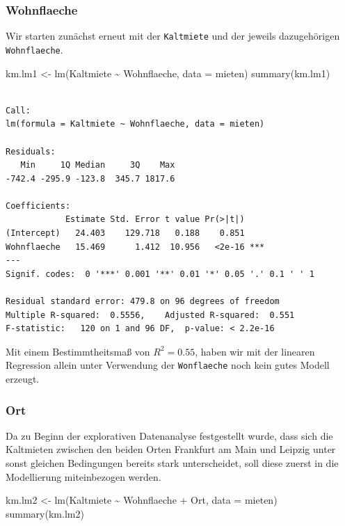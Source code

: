 \documentclass[
  a4paper,
  DIV=11]{scrartcl}
\newenvironment{Shaded}{\begin{snugshade}}{\end{snugshade}}
\newcommand{\AttributeTok}[1]{\textcolor[rgb]{0.40,0.45,0.13}{#1}}
\newcommand{\FunctionTok}[1]{\textcolor[rgb]{0.28,0.35,0.67}{#1}}
\newcommand{\NormalTok}[1]{\textcolor[rgb]{0.00,0.23,0.31}{#1}}
\newcommand{\OtherTok}[1]{\textcolor[rgb]{0.00,0.23,0.31}{#1}}
\newcommand{\SpecialCharTok}[1]{\textcolor[rgb]{0.37,0.37,0.37}{#1}}
\begin{document}
\hypertarget{wohnflaeche}{%
\subsubsection{Wohnflaeche}\label{wohnflaeche}}

Wir starten zunächst erneut mit der \texttt{Kaltmiete} und der jeweils
dazugehörigen \texttt{Wohnflaeche}.

\begin{Shaded}
\begin{Highlighting}[]
\NormalTok{km.lm1 }\OtherTok{\textless{}{-}} \FunctionTok{lm}\NormalTok{(Kaltmiete }\SpecialCharTok{\textasciitilde{}}\NormalTok{ Wohnflaeche, }\AttributeTok{data =}\NormalTok{ mieten)}
\FunctionTok{summary}\NormalTok{(km.lm1)}
\end{Highlighting}
\end{Shaded}

\begin{verbatim}

Call:
lm(formula = Kaltmiete ~ Wohnflaeche, data = mieten)

Residuals:
   Min     1Q Median     3Q    Max 
-742.4 -295.9 -123.8  345.7 1817.6 

Coefficients:
            Estimate Std. Error t value Pr(>|t|)    
(Intercept)   24.403    129.718   0.188    0.851    
Wohnflaeche   15.469      1.412  10.956   <2e-16 ***
---
Signif. codes:  0 '***' 0.001 '**' 0.01 '*' 0.05 '.' 0.1 ' ' 1

Residual standard error: 479.8 on 96 degrees of freedom
Multiple R-squared:  0.5556,    Adjusted R-squared:  0.551 
F-statistic:   120 on 1 and 96 DF,  p-value: < 2.2e-16
\end{verbatim}

Mit einem Bestimmtheitsmaß von \(R^2 = 0.55\), haben wir mit der
linearen Regression allein unter Verwendung der \texttt{Wonflaeche} noch
kein gutes Modell erzeugt.

\hypertarget{ort}{%
\subsubsection{Ort}\label{ort}}

Da zu Beginn der explorativen Datenanalyse festgestellt wurde, dass sich
die Kaltmieten zwischen den beiden Orten Frankfurt am Main und Leipzig
unter sonst gleichen Bedingungen bereits stark unterscheidet, soll diese
zuerst in die Modellierung miteinbezogen werden.

\begin{Shaded}
\begin{Highlighting}[]
\NormalTok{km.lm2 }\OtherTok{\textless{}{-}} \FunctionTok{lm}\NormalTok{(Kaltmiete }\SpecialCharTok{\textasciitilde{}}\NormalTok{ Wohnflaeche }\SpecialCharTok{+}\NormalTok{ Ort, }\AttributeTok{data =}\NormalTok{ mieten)}
\FunctionTok{summary}\NormalTok{(km.lm2)}
\end{Highlighting}
\end{Shaded}
\end{document}
